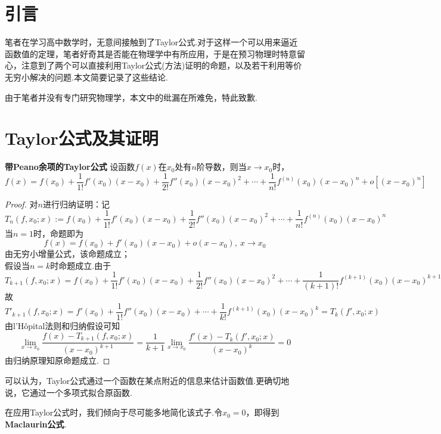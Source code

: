 
\iffalse
\fi


\chapter{引言}

笔者在学习高中数学时，无意间接触到了Taylor公式.对于这样一个可以用来逼近函数值的定理，笔者好奇其是否能在物理学中有所应用，于是在预习物理时特意留心，注意到了两个可以直接利用Taylor公式(方法)证明的命题，以及若干利用等价无穷小解决的问题.本文简要记录了这些结论.

由于笔者并没有专门研究物理学，本文中的纰漏在所难免，特此致歉.

\chapter{Taylor公式及其证明}

\begin{theorem}{\textbf{带Peano余项的Taylor公式}\cite{ayumu}}
	设函数$f(x)$在$x_0$处有$n$阶导数，则当$x \to x_0$时，$$f(x) = f(x_0) + \frac{1}{1!}f'(x_0)(x-x_0) + \frac{1}{2!}f''(x_0)(x-x_0)^2 + \cdots + \frac{1}{n!}f^{(n)}(x_0)(x-x_0)^n + o[(x-x_0)^n]$$
\end{theorem}
\begin{proof}
	对$n$进行归纳证明：记$$T_{n}(f,x_0;x):=f(x_0) + \frac{1}{1!}f'(x_0)(x-x_0) + \frac{1}{2!}f''(x_0)(x-x_0)^2 + \cdots + \frac{1}{n!}f^{(n)}(x_0)(x-x_0)^n$$
	当$n=1$时，命题即为$$f(x)=f(x_0)+f'(x_0)(x-x_0)+o(x-x_0),~x \to x_0$$
	由无穷小增量公式，该命题成立； \\
	假设当$n=k$时命题成立.由于
	$$T_{k+1}(f,x_0;x)=f(x_0) + \frac{1}{1!}f'(x_0)(x-x_0) + \frac{1}{2!}f''(x_0)(x-x_0)^2 + \cdots + \frac{1}{(k+1)!}f^{(k+1)}(x_0)(x-x_0)^{k+1}$$
	故
	$$T'_{k+1}(f,x_0;x)=f'(x_0) + \frac{1}{1!}f''(x_0)(x-x_0) + \cdots + \frac{1}{k!}f^{(k+1)}(x_0)(x-x_0)^{k} = T_k(f',x_0;x)$$
	由l’Hôpital法则和归纳假设可知$$\lim_{x \to x_0} \frac{f(x)-T_{k+1}(f,x_0;x)}{(x-x_0)^{k+1}} = \frac{1}{k+1} \lim_{x \to x_0} \frac{f'(x)-T_{k}(f',x_0;x)}{(x-x_0)^{k}} = 0$$
	由归纳原理知原命题成立.
\end{proof}

可以认为，Taylor公式通过一个函数在某点附近的信息来估计函数值.更确切地说，它通过一个多项式拟合原函数.

在应用Taylor公式时，我们倾向于尽可能多地简化该式子.令$x_0=0$，即得到\textbf{Maclaurin公式}.

